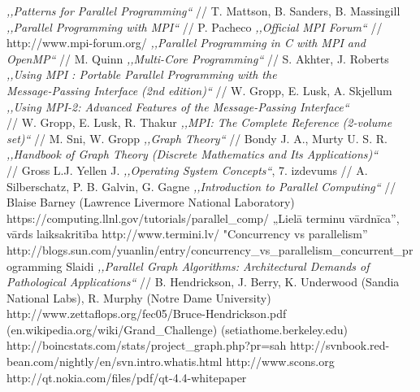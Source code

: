 \begin{thebibliography}{99}
	 \emph{,,Patterns for Parallel Programming``} // T. Mattson, B. Sanders, B. Massingill
	 \emph{,,Parallel Programming with MPI``} // P. Pacheco
	 \emph{,,Official MPI Forum``} // http://www.mpi-forum.org/
	 \emph{,,Parallel Programming in C with MPI and OpenMP``} // M. Quinn
	 \emph{,,Multi-Core Programming``} // S. Akhter, J. Roberts
	 \emph{,,Using MPI : Portable Parallel Programming with the\\ Message-Passing Interface (2nd edition)``} // W. Gropp, E. Lusk, A. Skjellum
	 \emph{,,Using MPI-2: Advanced Features of the Message-Passing Interface``} \\ // W. Gropp, E. Lusk, R. Thakur
	 \emph{,,MPI: The Complete Reference (2-volume set)``} // M. Sni, W. Gropp
	 \emph{,,Graph Theory``} // Bondy J. A., Murty U. S. R.
	 \emph{,,Handbook of Graph Theory (Discrete Mathematics and Its Applications)``} \\ // Gross L.J. Yellen J.
	 \emph{,,Operating System Concepts``}, 7. izdevums // A. Silberschatz, P. B. Galvin, G. Gagne
	 \emph{,,Introduction to Parallel Computing``} // Blaise Barney (Lawrence Livermore National Laboratory)
		https://computing.llnl.gov/tutorials/parallel\_comp/
	 „Lielā terminu vārdnīca”, vārds laiksakritība http://www.termini.lv/ 
	 "Concurrency vs parallelism” http://blogs.sun.com/yuanlin/entry/concurrency\_vs\_parallelism\_concurrent\_programming
	 Slaidi \emph{,,Parallel Graph Algorithms: Architectural Demands of Pathological Applications``} // 
		B. Hendrickson, J. Berry, K. Underwood (Sandia National Labs), R. Murphy (Notre Dame University)
		http://www.zettaflops.org/fec05/Bruce-Hendrickson.pdf
	 (en.wikipedia.org/wiki/Grand\_Challenge)
	 (setiathome.berkeley.edu)
	 http://boincstats.com/stats/project\_graph.php?pr=sah
	 http://svnbook.red-bean.com/nightly/en/svn.intro.whatis.html
	 http://www.scons.org
	 http://qt.nokia.com/files/pdf/qt-4.4-whitepaper
\end{thebibliography}

